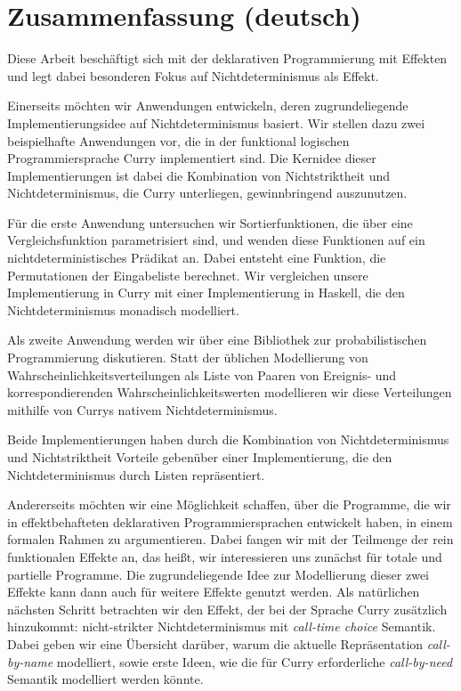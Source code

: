 \chapter*{Zusammenfassung (deutsch)}
\label{sec:abstract-diff}

Diese Arbeit besch\"aftigt sich mit der deklarativen Programmierung mit Effekten und legt dabei besonderen Fokus auf Nichtdeterminismus als Effekt.

Einerseits m\"ochten wir Anwendungen entwickeln, deren zugrundeliegende Implementierungsidee auf Nichtdeterminismus basiert.
Wir stellen dazu zwei beispielhafte Anwendungen vor, die in der funktional logischen Programmiersprache Curry implementiert sind.
Die Kernidee dieser Implementierungen ist dabei die Kombination von Nichtstriktheit und Nichtdeterminismus, die Curry unterliegen, gewinnbringend auszunutzen.

F\"ur die erste Anwendung untersuchen wir Sortierfunktionen, die \"uber eine Vergleichsfunktion parametrisiert sind, und wenden diese Funktionen auf ein nichtdeterministisches Pr\"adikat an.
Dabei entsteht eine Funktion, die Permutationen der Eingabeliste berechnet.
Wir vergleichen unsere Implementierung in Curry mit einer Implementierung in Haskell, die den Nichtdeterminismus monadisch modelliert.

Als zweite Anwendung werden wir \"uber eine Bibliothek zur probabilistischen Programmierung diskutieren.
Statt der \"ublichen Modellierung von Wahrscheinlichkeitsverteilungen als Liste von Paaren von Ereignis- und korrespondierenden Wahrscheinlichkeitswerten modellieren wir diese Verteilungen mithilfe von Currys nativem Nichtdeterminismus.

Beide Implementierungen haben durch die Kombination von Nichtdeterminismus und Nichtstriktheit Vorteile geben\"uber einer Implementierung, die den Nichtdeterminismus durch Listen repr\"asentiert.

Andererseits m\"ochten wir eine M\"oglichkeit schaffen, \"uber die Programme, die wir in effektbehafteten deklarativen Programmiersprachen entwickelt haben, in einem formalen Rahmen zu argumentieren.
Dabei fangen wir mit der Teilmenge der rein funktionalen Effekte an, das hei\ss{}t, wir interessieren uns zun\"achst f\"ur totale und partielle Programme.
Die zugrundeliegende Idee zur Modellierung dieser zwei Effekte kann dann auch f\"ur weitere Effekte genutzt werden.
Als nat\"urlichen n\"achsten Schritt betrachten wir den Effekt, der bei der Sprache Curry zus\"atzlich hinzukommt: nicht\--strikter Nichtdeterminismus mit \emph{call\--time choice} Semantik.
Dabei geben wir eine \"Ubersicht dar\"uber, warum die aktuelle Repr\"asentation \emph{call\--by\--name} modelliert, sowie erste Ideen, wie die f\"ur Curry erforderliche \emph{call\--by\--need} Semantik modelliert werden k\"onnte.

\endgroup